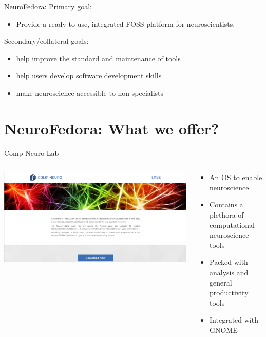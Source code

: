 \begin{frame}[c]{NeuroFedora:}
	\textcolor{FedoraBlue}{Primary goal:}
	\begin{itemize}
		\item Provide a \alert{ready to use, integrated FOSS platform} for neuroscientists\footnotemark[7].
	\end{itemize}
	\textcolor{FirstGreen}{Secondary/collateral goals:}
	\begin{itemize}
		\item help \alert{improve the standard and maintenance} of tools
		\item help users \alert{develop software development skills}
		\item \alert{make neuroscience accessible} to non-specialists
	\end{itemize}
\end{frame}

\section{NeuroFedora: What we offer?}

\begin{frame}[c]{Comp-Neuro Lab}
	\begin{columns}
		\begin{column}{0.4\textwidth}
			\includegraphics[keepaspectratio,width=\textwidth]{images/comp-neuro-lab.png}
		\end{column}
  		\begin{column}{0.6\textwidth}	
			\begin{itemize}
				\item An OS to enable neuroscience
				\item Contains a plethora of computational neuroscience tools
				\item Packed with analysis and general productivity tools
				\item Integrated with GNOME
			\end{itemize}
		\end{column}
	\end{columns}
\end{frame}

